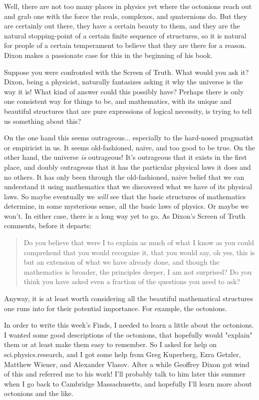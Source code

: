 Well, there are not too many places in physics yet
where the octonions reach out and grab one with the force 
the reals, complexes, and quaternions do.  But they are
certainly out there, they have a certain beauty to them,
and they are the natural stopping-point of a certain finite
sequence of structures, so it is natural for people
of a certain temperament to believe that they are there for a
reason.  Dixon makes a passionate case for this in the beginning
of his book.  

Suppose you were confronted with the Screen of Truth.  
What would you ask it?  Dixon, being a physicist,
naturally fantasizes asking it why the universe is the way it
is!  What kind of answer could this possibly have?  Perhaps
there is only one consistent way for things to be, and mathematics,
with its unique and beautiful structures that are pure expressions
of logical necessity, is trying to tell us something about this?  

On the one hand this seems outrageous... especially to the 
hard-nosed pragmatist or empiricist in us.  It seems 
old-fashioned, naive, and too good to be true.  On the other hand, the
universe \emph{is} outrageous!  It's outrageous that it exists in the
first place, and doubly outrageous that it has the particular
physical laws it does and no others.  It has only been through
the old-fashioned, naive belief that we can understand it using
mathematics that we discovered what we have of its physical laws.  
So maybe eventually we \emph{will} see that the basic structures of
mathematics determine, in some mysterious sense, all the basic
laws of physics.  Or maybe we won't.  In either case, there is
a long way yet to go.  As Dixon's Screen of Truth comments, before
it departs:

\begin{quote}
  Do you believe that were I to explain as much of what I know
  as you could comprehend that you would recognize it, that you 
  would say, oh yes, this is but an extension of what we have  
  already done, and though the mathematics is broader, the principles
  deeper, I am not surprised?  Do you think you have asked even a
  fraction of the questions you need to ask?
\end{quote}
    

Anyway, it is at least worth considering all the beautiful mathematical
structures one runs into for their potential importance.  For example,
the octonions.  

In order to write this week's Finds, I needed to learn a little about
the octonions.  I wanted some good descriptions of the octonions, 
that hopefully would "explain" them or at least make them easy
to remember.  So I asked for help on sci.physics.research, and I
got some help from Greg Kuperberg, Ezra Getzler, Matthew Wiener,
and Alexander Vlasov.  After a while Geoffrey Dixon got wind of this
and referred me to his work!  I'll probably talk to him later this
summer when I go back to Cambridge Massachusetts, and hopefully
I'll learn more about octonions and the like.  

